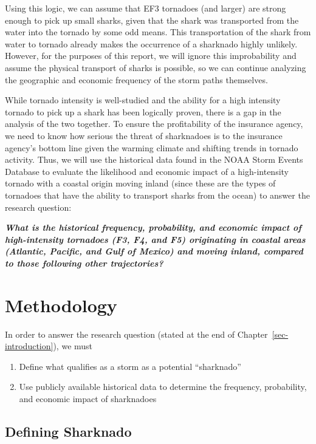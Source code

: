 \documentclass[
  letterpaper,
  DIV=11,
  numbers=noendperiod]{scrreprt}
\providecommand{\tightlist}{%
  \setlength{\itemsep}{0pt}\setlength{\parskip}{0pt}}
\begin{document}
Using this logic, we can assume that EF3 tornadoes (and larger) are
strong enough to pick up small sharks, given that the shark was
transported from the water into the tornado by some odd means. This
transportation of the shark from water to tornado already makes the
occurrence of a sharknado highly unlikely. However, for the purposes of
this report, we will ignore this improbability and assume the physical
transport of sharks is possible, so we can continue analyzing the
geographic and economic frequency of the storm paths themselves.

While tornado intensity is well-studied and the ability for a high
intensity tornado to pick up a shark has been logically proven, there is
a gap in the analysis of the two together. To ensure the profitability
of the insurance agency, we need to know how serious the threat of
sharknadoes is to the insurance agency's bottom line given the warming
climate and shifting trends in tornado activity. Thus, we will use the
historical data found in the NOAA Storm Events Database to evaluate the
likelihood and economic impact of a high-intensity tornado with a
coastal origin moving inland (since these are the types of tornadoes
that have the ability to transport sharks from the ocean) to answer the
research question:

\textbf{\emph{What is the historical frequency, probability, and
economic impact of high-intensity tornadoes (F3, F4, and F5) originating
in coastal areas (Atlantic, Pacific, and Gulf of Mexico) and moving
inland, compared to those following other trajectories?}}


\chapter{Methodology}\label{methodology}

In order to answer the research question (stated at the end of
Chapter~\ref{sec-introduction}), we must

\begin{enumerate}
\def\labelenumi{\arabic{enumi}.}
\tightlist
\item
  Define what qualifies as a storm as a potential ``sharknado''
\item
  Use publicly available historical data to determine the frequency,
  probability, and economic impact of sharknadoes
\end{enumerate}

\section{Defining Sharknado}\label{sec-define-sharknado}
\end{document}
